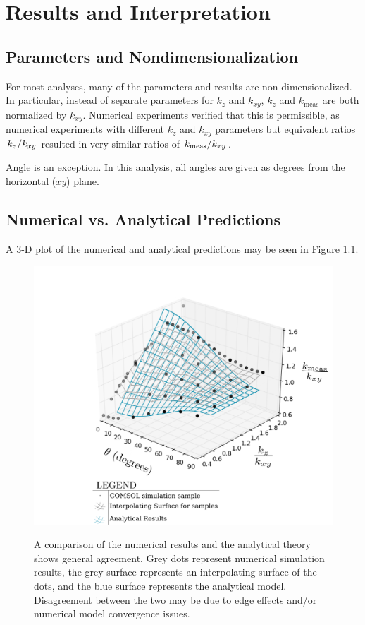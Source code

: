 \chapter{Results and Interpretation}

\section{Parameters and Nondimensionalization}

For most analyses, many of the parameters and results are non-dimensionalized. In
particular, instead of separate parameters for \(k_z\) and \(k_{xy}\), \(k_z\)
and \(k_{\textrm{meas}}\) are both normalized by \(k_{xy}\). Numerical
experiments verified that this is permissible, as numerical experiments with
different \(k_z\) and \(k_{xy}\) parameters but equivalent ratios
\(\left.{k_z}\middle/{k_{xy}}\right.\) resulted in very similar ratios of
\(\left.{k_{\textrm{meas}}}\middle/{k_{xy}}\right.\).

Angle is an exception. In this analysis, all angles are given as degrees from
the horizontal (\(xy\)) plane.

\section{Numerical vs. Analytical Predictions}

A 3-D plot of the numerical and analytical predictions may be seen in 
Figure \ref{fig:numvanal}.

\begin{figure}[h]
\centering
\includegraphics[width=\textwidth]{fig/numvanal.png}
\label{fig:numvanal}
\caption{A comparison of the numerical results and the analytical theory shows
general agreement. Grey dots represent numerical simulation results, the grey surface represents an interpolating surface of the dots, and the blue surface represents the analytical model. Disagreement between the two may be due to edge effects and/or numerical
model convergence issues.}
\end{figure}

